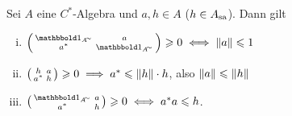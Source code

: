 \begin{lemma}[label=lem:38]
	Sei $A$ eine $C^*$-Algebra und $a,h \in A$ ($h \in A_\sa$).
	Dann gilt
	\begin{enumerate}[(i)]
		\item $\begin{psmallmatrix}
			\ind_{A^\simm} & a \\
			a^* & \ind_{A^\simm}
		\end{psmallmatrix} \ge 0 \iff \norm*{a} \le 1$
		\item $\begin{psmallmatrix}
			h & a \\
			a^* & h
		\end{psmallmatrix} \ge 0 \implies a^* \le \norm*{h} \cdot h$, also $\norm*{a} \le \norm*{h}$
		\item $\begin{psmallmatrix}
			\ind_{A^\simm} & a \\
			a^* & h
		\end{psmallmatrix} \ge 0 \iff a^*a \le h$. 
	\end{enumerate}
\end{lemma}
